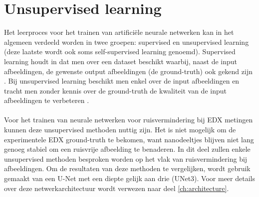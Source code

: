 \documentclass{report}
\begin{document}
\section{Unsupervised learning} \label{ch:unsupervised}
Het leerproces voor het trainen van artificiële neurale netwerken kan in het algemeen verdeeld worden in twee groepen: supervised en unsupervised learning (deze laatste wordt ook soms self-supervised learning genoemd). Supervised learning houdt in dat men over een dataset beschikt waarbij, naast de input afbeeldingen, de gewenste output afbeeldingen (de ground-truth) ook gekend zijn \cite{book:ann}. Bij unsupervised learning beschikt men enkel over de input afbeeldingen en tracht men zonder kennis over de ground-truth de kwaliteit van de input afbeeldingen te verbeteren \cite{paper:n2n, paper:n2v, paper:n2s}.
\\ \\
Voor het trainen van neurale netwerken voor ruisvermindering bij EDX metingen kunnen deze unsupervised methoden nuttig zijn. Het is niet mogelijk om de experimentele EDX ground-truth te bekomen, want nanodeeltjes blijven niet lang genoeg stabiel om een ruisvrije afbeelding te benaderen. In dit deel zullen enkele unsupervised methoden besproken worden op het vlak van ruisvermindering bij afbeeldingen. Om de resultaten van deze methoden te vergelijken, wordt gebruik gemaakt van een U-Net met een diepte gelijk aan drie (UNet3). Voor meer details over deze netwerkarchitectuur wordt verwezen naar deel \ref{ch:architecture}.
\end{document}
